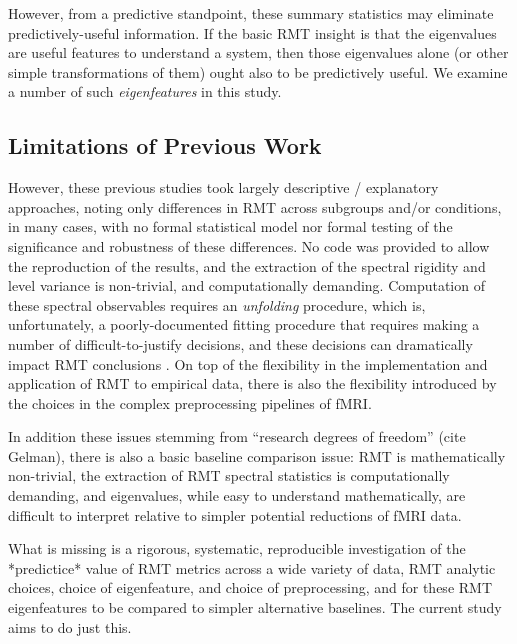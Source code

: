 \documentclass[12pt]{spieman}  %
\begin{document}
\begin{spacing}{2}
However, from a predictive standpoint, these summary statistics may eliminate predictively-useful
information. If the basic RMT insight is that the eigenvalues are useful features to understand a
system, then those eigenvalues alone (or other simple transformations of them) ought also to be
predictively useful. We examine a number of such \textit{eigenfeatures} in this study.


\subsection{Limitations of Previous Work}

However, these previous studies took largely descriptive / explanatory approaches, noting only
differences in RMT across subgroups and/or conditions, in many cases, with no formal statistical
model nor formal testing of the significance and robustness of these differences. No code was provided to
allow the reproduction of the results, and the extraction of the spectral rigidity and level
variance is non-trivial, and computationally demanding. Computation of these spectral observables
requires an \textit{unfolding}
procedure\cite{guhrRandommatrixTheoriesQuantum1998a,mehtaRandomMatrices2004}, which is,
unfortunately, a poorly-documented fitting procedure that requires making a number of
difficult-to-justify decisions, and these decisions can dramatically impact RMT conclusions
\cite{abul-magdUnfoldingSpectrumChaotic2014,abueleninSpectralUnfoldingChaotic2018,fossionRandommatrixSpectraTime2013,abueleninEffectUnfoldingSpectral2012,moralesImprovedUnfoldingDetrending2011}.
On top of the flexibility in the implementation and application of RMT to empirical data, there
is also the flexibility introduced by the choices in the complex preprocessing pipelines of fMRI\cite{parkerBenefitSliceTiming2019}.

In addition these issues stemming from ``research degrees of freedom'' (cite Gelman), there is also
a basic baseline comparison issue: RMT is mathematically non-trivial, the extraction of RMT
spectral statistics is computationally demanding, and eigenvalues, while easy to understand
mathematically, are difficult to interpret relative to simpler potential reductions of fMRI data.

What is missing is a rigorous, systematic, reproducible investigation of the *predictice* value of
RMT metrics across a wide variety of data, RMT analytic choices, choice of eigenfeature, and choice
of preprocessing, and for these RMT eigenfeatures to be compared to simpler alternative baselines.
The current study aims to do just this.



\end{spacing}
\end{document}
